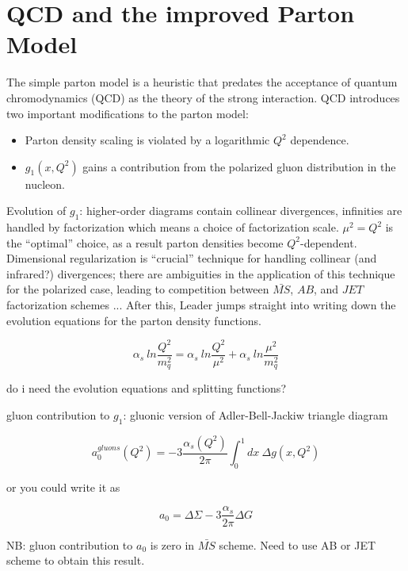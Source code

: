\section{QCD and the improved Parton Model}

The simple parton model is a heuristic that predates the acceptance of quantum
chromodynamics (QCD) as the theory of the strong interaction. QCD introduces
two important modifications to the parton model:
%
\begin{itemize}
  \item Parton density scaling is violated by a logarithmic $Q^2$ dependence.
  \item $g_1(x,Q^2)$ gains a contribution from the polarized gluon
  distribution in the nucleon.
\end{itemize}
%

Evolution of $g_1$: higher-order diagrams contain collinear divergences,
infinities are handled by factorization which means a choice of factorization
scale. $\mu^2 = Q^2$ is the ``optimal'' choice, as a result parton densities
become $Q^2$-dependent. Dimensional regularization is ``crucial'' technique
for handling collinear (and infrared?) divergences; there are ambiguities in
the application of this technique for the polarized case, leading to
competition between $\bar{MS}$, $AB$, and $JET$ factorization schemes ...
After this, Leader jumps straight into writing down the evolution equations
for the parton density functions.

\begin{equation}
  \alpha_s~ln \frac{Q^2}{m_q^2} = \alpha_s~ln \frac{Q^2}{\mu^2} + \alpha_s~ln \frac{\mu^2}{m_q^2}
\end{equation}

do i need the evolution equations and splitting functions?

gluon contribution to $g_1$:  gluonic version of Adler-Bell-Jackiw triangle diagram 

\begin{equation}
  a_0^{gluons}(Q^2) = -3 \frac{\alpha_s(Q^2)}{2\pi} \int_0^1 dx~\Delta g(x, Q^2)
\end{equation}

or you could write it as

\begin{equation}
  a_0 = \Delta \Sigma - 3 \frac{\alpha_s}{2\pi}\Delta G
\end{equation}

NB: gluon contribution to $a_0$ is zero in $\bar{MS}$ scheme.  Need to use AB or JET scheme to obtain this result.

